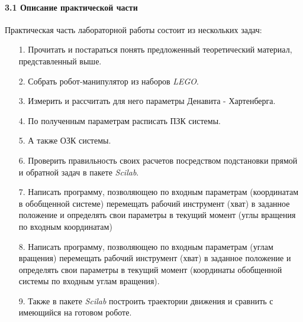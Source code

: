 \paragraph*{3.1 Описание практической части\\}

\hspace*{\parindent}Практическая часть лабораторной работы состоит из нескольких задач:\\

\begin{enumerate} 
\item[1.] Прочитать и постараться понять предложенный теоретический материал, представленный выше.
\item[2.] Собрать робот-манипулятор из наборов \textit{LEGO}.
\item[3.] Измерить и рассчитать для него параметры Денавита - Хартенберга.
\item[4.] По полученным параметрам расписать ПЗК системы.
\item[5.] А также ОЗК системы.
\item[6.] Проверить правильность своих расчетов посредством подстановки прямой и обратной задач в пакете \textit{Scilab}.
\item[7.] Написать программу, позволяющею по входным параметрам (координатам в обобщенной системе) перемещать рабочий инструмент (хват) в заданное положение и определять свои параметры в текущий момент (углы вращения по входным координатам)
\item[8.] Написать программу, позволяющею по входным параметрам (углам вращения) перемещать рабочий инструмент (хват) в заданное положение и определять свои параметры в текущий момент (координаты обобщенной системы по входным углам вращения).
\item[9.] Также в пакете \textit{Scilab} построить траектории движения и сравнить с имеющийся на готовом роботе. 
 \end{enumerate}